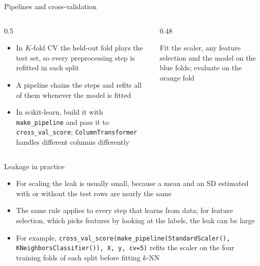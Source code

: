 \begin{frame}{Pipelines and cross-validation}
    \begin{columns}[T]
        \begin{column}{0.5\textwidth}
            \begin{itemize}
                \item In $K$-fold CV the held-out fold plays the test set, so every preprocessing step is refitted in each split
                \item A pipeline chains the steps and refits all of them whenever the model is fitted
                \item In scikit-learn, build it with \texttt{make\_pipeline} and pass it to \texttt{cross\_val\_score}; \texttt{ColumnTransformer} handles different columns differently
            \end{itemize}
        \end{column}
        \begin{column}{0.48\textwidth}
            \centering

            \svspace{0.3em}
            {\scriptsize Fit the scaler, any feature selection and the model on the blue folds; evaluate on the orange fold}
        \end{column}
    \end{columns}
\end{frame}

\begin{frame}{Leakage in practice}
    \begin{itemize}
        \item For scaling the leak is usually small, because a mean and an SD estimated with or without the test rows are nearly the same
        \item The same rule applies to every step that learns from data; for feature selection, which picks features by looking at the labels, the leak can be large
        \item For example, \texttt{cross\_val\_score(make\_pipeline(StandardScaler(), KNeighborsClassifier()), X, y, cv=5)} refits the scaler on the four training folds of each split before fitting $k$-NN
    \end{itemize}
\end{frame}

